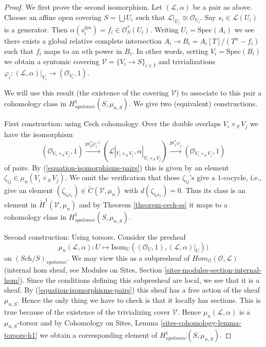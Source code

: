 \begin{proof}
We first prove the second isomorphism.
Let $(\mathcal{L}, \alpha)$ be a pair as above.
Choose an affine open covering $S = \bigcup U_i$ such that
$\mathcal{L}|_{U_i} \cong \mathcal{O}_{U_i}$. Say $s_i \in \mathcal{L}(U_i)$
is a generator. Then $\alpha(s_i^{\otimes n}) = f_i \in \mathcal{O}_S^*(U_i)$.
Writing $U_i = \text{Spec}(A_i)$ we see there exists a global
relative complete intersection $A_i \to B_i = A_i[T]/(T^n - f_i)$
such that $f_i$ maps to an $n$th power in $B_i$. In other words, setting
$V_i = \text{Spec}(B_i)$ we obtain a syntomic covering
$\mathcal{V} = \{V_i \to S\}_{i \in I}$ and trivializations
$\varphi_i : (\mathcal{L}, \alpha)|_{V_i} \to (\mathcal{O}_{V_i}, 1)$.

\medskip\noindent
We will use this result (the existence of the covering $\mathcal{V}$)
to associate to this pair a cohomology class in
$H^1_{syntomic}(S, \mu_{n, S})$. We give two (equivalent) constructions.

\medskip\noindent
First construction: using \u Cech cohomology.
Over the double overlaps $V_i \times_S V_j$ we have the isomorphism
$$
(\mathcal{O}_{V_i \times_S V_j}, 1)
\xrightarrow{\text{pr}_0^*\varphi_i^{-1}}
(\mathcal{L}|_{V_i \times_S V_j}, \alpha|_{V_i \times_S V_j})
\xrightarrow{\text{pr}_1^*\varphi_j}
(\mathcal{O}_{V_i \times_S V_j}, 1)
$$
of pairs. By (\ref{equation-isomorphisms-pairs}) this is given by an
element $\zeta_{ij} \in \mu_n(V_i \times_S V_j)$. We omit the verification
that these $\zeta_{ij}$'s give a $1$-cocycle, i.e., give
an element $(\zeta_{i_0i_1}) \in \check C(\mathcal{V}, \mu_n)$
with $d(\zeta_{i_0i_1}) = 0$. Thus its class is an element in
$\check H^1(\mathcal{V}, \mu_n)$ and by
Theorem \ref{theorem-cech-ss}
it maps to a cohomology class in $H^1_{syntomic}(S, \mu_{n, S})$.

\medskip\noindent
Second construction: Using torsors. Consider the presheaf
$$
\mu_n(\mathcal{L}, \alpha) :
U
\longmapsto
\text{Isom}_U((\mathcal{O}_U, 1), (\mathcal{L}, \alpha)|_U))
$$
on $(\textit{Sch}/S)_{syntomic}$.
We may view this as a subpresheaf of
$\textit{Hom}_{\mathcal{O}}(\mathcal{O}, \mathcal{L})$ (internal hom
sheaf, see
Modules on Sites, Section \ref{sites-modules-section-internal-hom}).
Since the conditions defining this subpresheaf are local, we see that it is
a sheaf.
By (\ref{equation-isomorphisms-pairs}) this sheaf has a free action of
the sheaf $\mu_{n, S}$. Hence the only thing we have to check is that
it locally has sections. This is true because of the existence of the
trivializing cover $\mathcal{V}$. Hence $\mu_n(\mathcal{L}, \alpha)$
is a $\mu_{n, S}$-torsor and by
Cohomology on Sites, Lemma \ref{sites-cohomology-lemma-torsors-h1}
we obtain a corresponding element of $H^1_{syntomic}(S, \mu_{n, S})$.


\end{proof}
